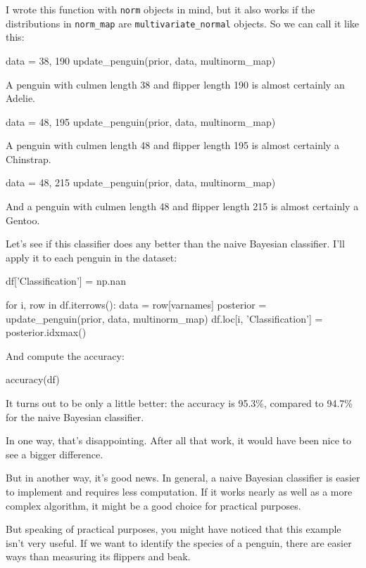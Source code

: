 \documentclass[12pt]{book}
\theoremstyle{exercise}
\newcommand{\py}[1]{{\tt #1}}%
\begin{document}
I wrote this function with \py{norm} objects in
mind, but it also works if the distributions in
\py{norm_map} are
\py{multivariate_normal} objects. So we can call
it like this:

\begin{code}
data = 38, 190
update_penguin(prior, data, multinorm_map)
\end{code}

A penguin with culmen length 38 and flipper length 190 is almost
certainly an Adelie.

\begin{code}
data = 48, 195
update_penguin(prior, data, multinorm_map)
\end{code}

A penguin with culmen length 48 and flipper length 195 is almost
certainly a Chinstrap.

\begin{code}
data = 48, 215
update_penguin(prior, data, multinorm_map)
\end{code}

And a penguin with culmen length 48 and flipper length 215 is almost
certainly a Gentoo.

Let's see if this classifier does any better than the naive Bayesian
classifier. I'll apply it to each penguin in the dataset:

\begin{code}
df['Classification'] = np.nan

for i, row in df.iterrows():
    data = row[varnames]
    posterior = update_penguin(prior, data, multinorm_map)
    df.loc[i, 'Classification'] = posterior.idxmax()
\end{code}

And compute the accuracy:

\begin{code}
accuracy(df)
\end{code}

It turns out to be only a little better: the accuracy is 95.3\%,
compared to 94.7\% for the naive Bayesian classifier.

In one way, that's disappointing. After all that work, it would have
been nice to see a bigger difference.

But in another way, it's good news. In general, a naive Bayesian
classifier is easier to implement and requires less computation. If it
works nearly as well as a more complex algorithm, it might be a good
choice for practical purposes.

But speaking of practical purposes, you might have noticed that this
example isn't very useful. If we want to identify the species of a
penguin, there are easier ways than measuring its flippers and beak.
\end{document}
